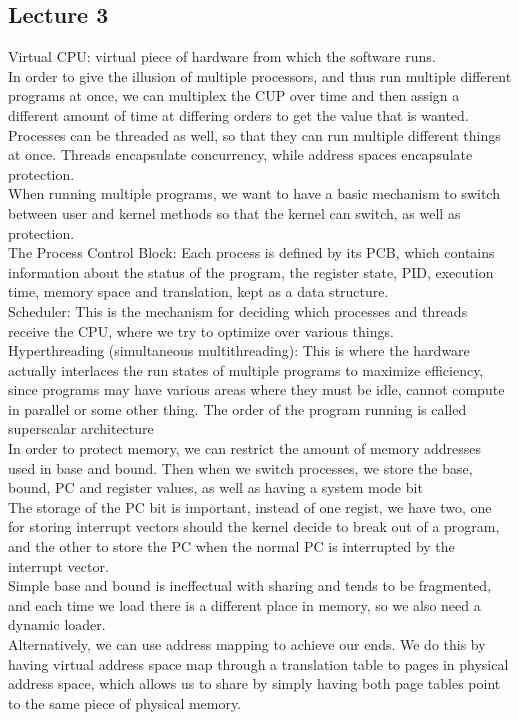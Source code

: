 \documentclass[paper=a4, fontsize=11pt]{scrartcl} %
\numberwithin{equation}{section} %
\numberwithin{figure}{section} %
\numberwithin{table}{section} %
\begin{document}
\subsection{Lecture 3}
Virtual CPU: virtual piece of hardware from which the software runs. \\
In order to give the illusion of multiple processors, and thus run multiple different programs at once, we can multiplex the CUP over time and then assign a different amount of time at differing orders to get the value that is wanted. \\
Processes can be threaded as well, so that they can run multiple different things at once. Threads encapsulate concurrency, while address spaces encapsulate protection. \\
When running multiple programs, we want to have a basic mechanism to switch between user and kernel methods so that the kernel can switch, as well as protection. \\
The Process Control Block: Each process is defined by its PCB, which contains information about the status of the program, the register state, PID, execution time, memory space and translation, kept as a data structure. \\
Scheduler: This is the mechanism for deciding which processes and threads receive the CPU, where we try to optimize over various things. \\
Hyperthreading (simultaneous multithreading): This is where the hardware actually interlaces the run states of multiple programs to maximize efficiency, since programs may have various areas where they must be idle, cannot compute in parallel or some other thing. The order of the program running is called superscalar architecture\\
In order to protect memory, we can restrict the amount of memory addresses used in base and bound. Then when we switch processes, we store the base, bound, PC and register values, as well as having a system mode bit\\
The storage of the PC bit is important, instead of one regist, we have two, one for storing interrupt vectors should the kernel decide to break out of a program, and the other to store the PC when the normal PC is interrupted by the interrupt vector. \\
Simple base and bound is ineffectual with sharing and tends to be fragmented, and each time we load there is a different place in memory, so we also need a dynamic loader. \\
Alternatively, we can use address mapping to achieve our ends. We do this by having virtual address space map through a translation table to pages in physical address space, which allows us to share by simply having both page tables point to the same piece of physical memory. \\
\end{document}
